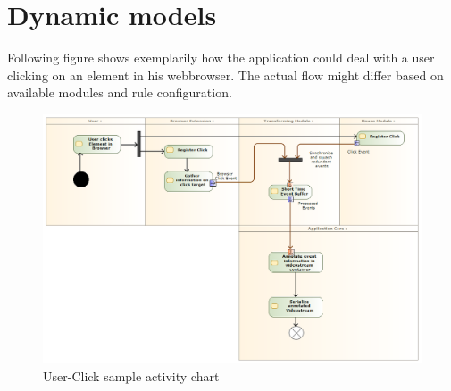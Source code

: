 \section{Dynamic models}
Following figure shows exemplarily how the application could deal with a user clicking on an element in his webbrowser. The actual flow might differ based on available modules and rule configuration.
\begin{figure}[h!]
  \includegraphics[width=1.00\textwidth]{resources/clickactivity.png}
  \centering
  \caption{User-Click sample activity chart}
  \label{fig:clickactivity}
\end{figure}
